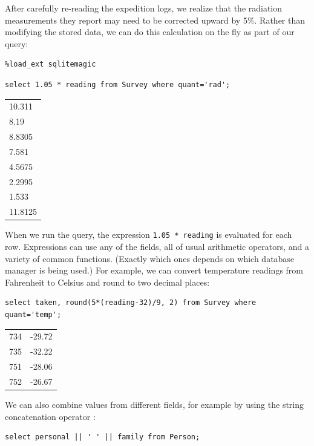 \documentclass{book}
\begin{document}
After carefully re-reading the expedition logs, we realize that the
radiation measurements they report may need to be corrected upward by
5\%. Rather than modifying the stored data, we can do this calculation
on the fly as part of our query:

\begin{verbatim}
%load_ext sqlitemagic
\end{verbatim}

\begin{verbatim}
select 1.05 * reading from Survey where quant='rad';
\end{verbatim}

\begin{tabular}{l}
10.311 \\
8.19 \\
8.8305 \\
7.581 \\
4.5675 \\
2.2995 \\
1.533 \\
11.8125 \\
\end{tabular}

When we run the query, the expression \texttt{1.05 * reading} is
evaluated for each row. Expressions can use any of the fields, all of
usual arithmetic operators, and a variety of common functions. (Exactly
which ones depends on which database manager is being used.) For
example, we can convert temperature readings from Fahrenheit to Celsius
and round to two decimal places:

\begin{verbatim}
select taken, round(5*(reading-32)/9, 2) from Survey where quant='temp';
\end{verbatim}

\begin{tabular}{ll}
734 & -29.72 \\
735 & -32.22 \\
751 & -28.06 \\
752 & -26.67 \\
\end{tabular}

We can also combine values from different fields, for example by using
the string concatenation operator \texttt{\textbar{}\textbar{}}:

\begin{verbatim}
select personal || ' ' || family from Person;
\end{verbatim}
\end{document}

